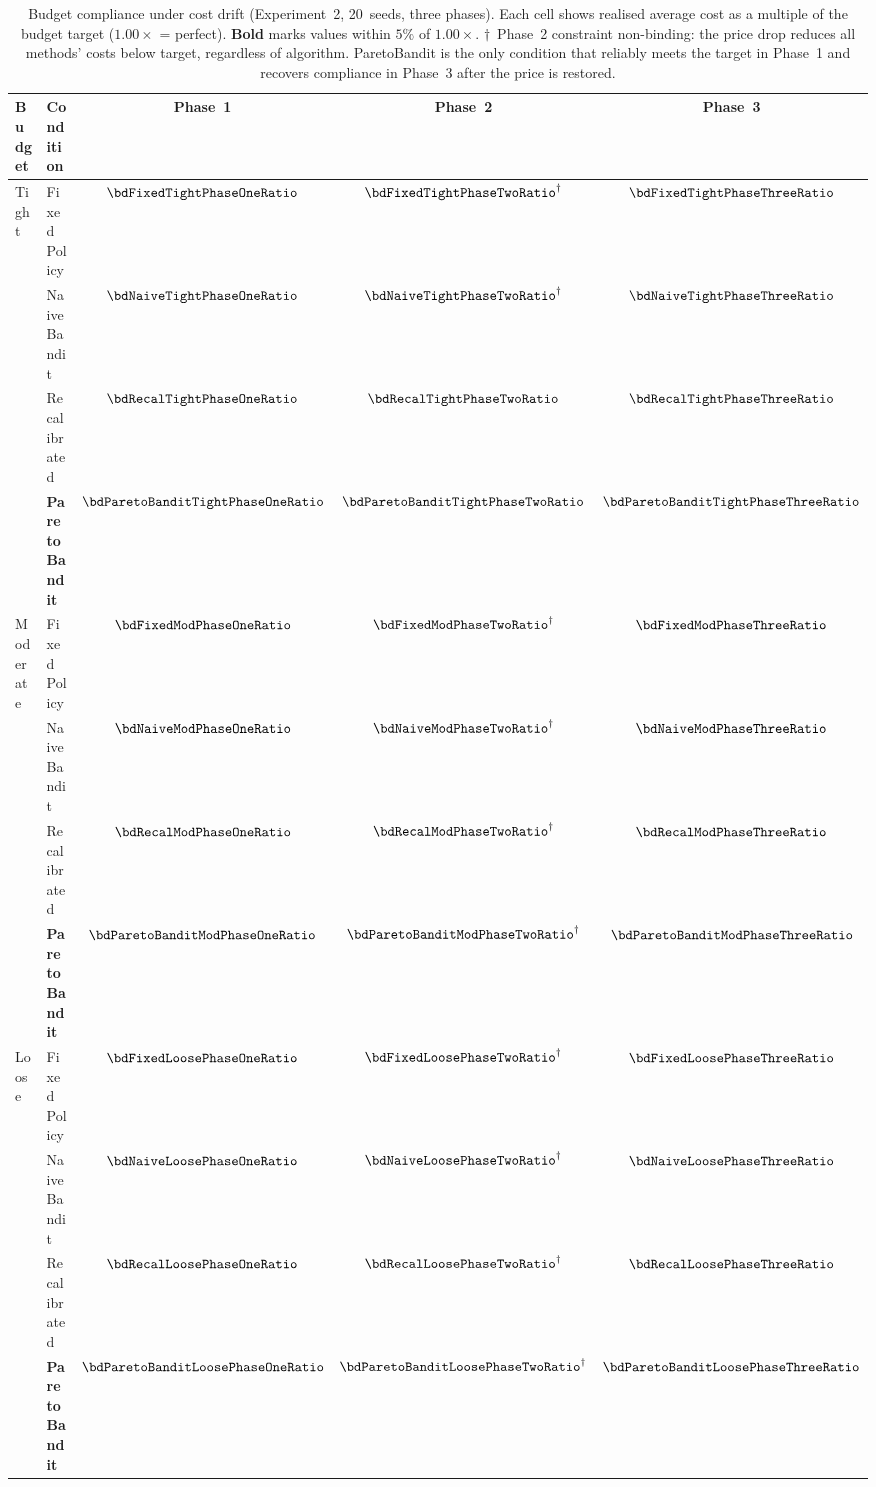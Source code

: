 \begin{table}[t]
\centering
\caption{Budget compliance under cost drift (Experiment~2,
20~seeds, three phases).  Each cell shows realised average cost
as a multiple of the budget target ($1.00\times$ = perfect).
\textbf{Bold} marks values within $5\%$ of $1.00\times$.
$\dagger$~Phase~2 constraint non-binding: the price drop reduces
all methods' costs below target, regardless of algorithm.
ParetoBandit is the only condition that reliably meets the target in
Phase~1 and recovers compliance in Phase~3 after the price is restored.}
\label{tab:budget_compliance}
\small
\begin{tabular}{@{}llccc@{}}
\toprule
\textbf{Budget} & \textbf{Condition}
  & \textbf{Phase~1} & \textbf{Phase~2} & \textbf{Phase~3} \\
\midrule
Tight        & Fixed Policy        & $\bdFixedTightPhaseOneRatio$ & $\bdFixedTightPhaseTwoRatio^{\dagger}$ & $\bdFixedTightPhaseThreeRatio$ \\
             & Naive Bandit        & $\bdNaiveTightPhaseOneRatio$ & $\bdNaiveTightPhaseTwoRatio^{\dagger}$ & $\mathbf{\bdNaiveTightPhaseThreeRatio}$ \\
             & Recalibrated        & $\bdRecalTightPhaseOneRatio$ & $\mathbf{\bdRecalTightPhaseTwoRatio}$ & $\bdRecalTightPhaseThreeRatio$ \\
             & \textbf{ParetoBandit}  & $\mathbf{\bdParetoBanditTightPhaseOneRatio}$ & $\mathbf{\bdParetoBanditTightPhaseTwoRatio}$ & $\mathbf{\bdParetoBanditTightPhaseThreeRatio}$ \\[3pt]
Moderate     & Fixed Policy        & $\bdFixedModPhaseOneRatio$ & $\bdFixedModPhaseTwoRatio^{\dagger}$ & $\bdFixedModPhaseThreeRatio$ \\
             & Naive Bandit        & $\bdNaiveModPhaseOneRatio$ & $\bdNaiveModPhaseTwoRatio^{\dagger}$ & $\bdNaiveModPhaseThreeRatio$ \\
             & Recalibrated        & $\bdRecalModPhaseOneRatio$ & $\bdRecalModPhaseTwoRatio^{\dagger}$ & $\bdRecalModPhaseThreeRatio$ \\
             & \textbf{ParetoBandit}  & $\mathbf{\bdParetoBanditModPhaseOneRatio}$ & $\bdParetoBanditModPhaseTwoRatio^{\dagger}$ & $\mathbf{\bdParetoBanditModPhaseThreeRatio}$ \\[3pt]
Loose        & Fixed Policy        & $\bdFixedLoosePhaseOneRatio$ & $\bdFixedLoosePhaseTwoRatio^{\dagger}$ & $\bdFixedLoosePhaseThreeRatio$ \\
             & Naive Bandit        & $\bdNaiveLoosePhaseOneRatio$ & $\bdNaiveLoosePhaseTwoRatio^{\dagger}$ & $\bdNaiveLoosePhaseThreeRatio$ \\
             & Recalibrated        & $\bdRecalLoosePhaseOneRatio$ & $\bdRecalLoosePhaseTwoRatio^{\dagger}$ & $\bdRecalLoosePhaseThreeRatio$ \\
             & \textbf{ParetoBandit}  & $\mathbf{\bdParetoBanditLoosePhaseOneRatio}$ & $\bdParetoBanditLoosePhaseTwoRatio^{\dagger}$ & $\mathbf{\bdParetoBanditLoosePhaseThreeRatio}$ \\
\bottomrule
\end{tabular}
\end{table}

